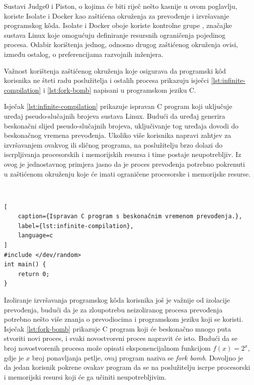 \documentclass[times, utf8, diplomski]{fer}
\begin{document}
Sustavi Judge0 i Piston, o kojima će biti riječ nešto kasnije u ovom poglavlju, koriste Isolate \citep{marevs2012new} i Docker \citep{merkel2014docker} kao zaštićena okruženja za prevođenje i izvršavanje programskog kôda. Isolate i Docker oboje koriste kontrolne grupe , značajke sustava Linux koje omogućuju definiranje resursnih ograničenja pojedinog procesa. Odabir korištenja jednog, odnosno drugog zaštićenog okruženja ovisi, između ostalog, o preferencijama razvojnih inženjera.

Važnost korištenja zaštićenog okruženja koje osigurava da programski kôd korisnika ne šteti radu poslužitelja i ostalih procesa prikazuju isječci \ref{lst:infinite-compilation} i \ref{lst:fork-bomb} napisani u programskom jeziku C. 

Isječak \ref{lst:infinite-compilation} prikazuje ispravan C program koji uključuje uređaj pseudo-slučajnih brojeva sustava Linux. Budući da uređaj generira beskonačni slijed pseudo-slučajnih brojeva, uključivanje tog uređaja dovodi do beskonačnog vremena prevođenja. Ukoliko više korisnika napravi zahtjev za izvršavanjem ovakvog ili sličnog programa, na poslužitelju brzo dolazi do iscrpljivanja procesorskih i memorijskih resursa i time postaje neupotrebljiv. Iz ovog je jednostavnog primjera jasno da je proces prevođenja potrebno pokrenuti u zaštićenom okruženju koje će imati ograničene procesorske i memorijske resurse.

\

\begin{lstlisting}[
    caption={Ispravan C program s beskonačnim vremenom prevođenja.},
    label={lst:infinite-compilation},
    language=c
]
#include </dev/random>
int main() {
    return 0;
}
\end{lstlisting}

Izoliranje izvršavanja programskog kôda korisnika još je važnije od izolacije prevođenja, budući da je za zloupotrebu neizoliranog procesa prevođenja potrebno nešto više znanja o prevodiocima i programskom jeziku koji se koristi. Isječak \ref{lst:fork-bomb} prikazuje C program koji će beskonačno mnogo puta stvoriti novi proces, i svaki novostvoreni proces napravit će isto. Budući da se broj novostvorenih procesa može opisati eksponencijalnom funkcijom $f(x) = 2^x$, gdje je $x$ broj ponavljanja petlje, ovaj program naziva se \textit{fork bomb}. Dovoljno je da jedan korisnik pokrene ovakav program da se na poslužitelju iscrpe procesorski i memorijski resursi koji će ga učiniti neupotrebljivim.
\end{document}
